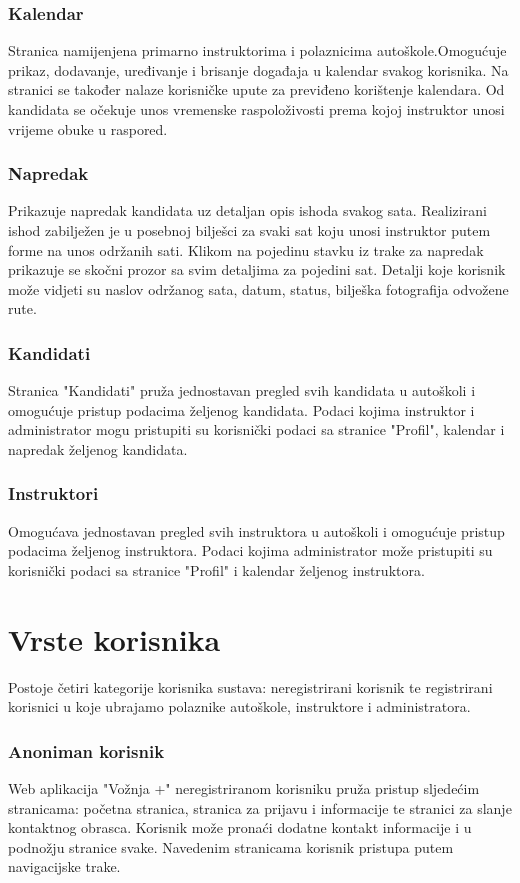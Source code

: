 \subsubsection{Kalendar}
Stranica namijenjena primarno instruktorima i polaznicima autoškole.Omogućuje prikaz, dodavanje, uređivanje i brisanje događaja u kalendar svakog korisnika. Na stranici se također nalaze korisničke upute za previđeno korištenje kalendara. Od kandidata se očekuje unos vremenske raspoloživosti prema kojoj instruktor unosi vrijeme obuke u raspored.
\subsubsection{Napredak}
Prikazuje napredak kandidata uz detaljan opis ishoda svakog sata. Realizirani ishod zabilježen je u posebnoj bilješci za svaki sat koju unosi instruktor putem forme na unos održanih sati. Klikom na pojedinu stavku iz trake za napredak prikazuje se skočni prozor sa svim detaljima za pojedini sat. Detalji koje korisnik može vidjeti su naslov održanog sata, datum, status, bilješka fotografija odvožene rute.
\subsubsection{Kandidati}
Stranica "Kandidati" pruža jednostavan pregled svih kandidata u autoškoli i omogućuje pristup podacima željenog kandidata. Podaci kojima instruktor i administrator mogu pristupiti su korisnički podaci sa stranice "Profil", kalendar i napredak željenog kandidata.
\subsubsection{Instruktori}
Omogućava  jednostavan pregled svih instruktora u autoškoli i omogućuje pristup podacima željenog instruktora. Podaci kojima administrator može pristupiti su korisnički podaci sa stranice "Profil"  i kalendar željenog instruktora.




\section{Vrste korisnika}
Postoje četiri kategorije korisnika sustava: neregistrirani korisnik te registrirani korisnici u koje ubrajamo  polaznike autoškole, instruktore i administratora.
\subsubsection{Anoniman korisnik}
Web aplikacija "Vožnja +" neregistriranom korisniku pruža pristup sljedećim stranicama: početna stranica, stranica za prijavu i informacije te stranici za slanje kontaktnog obrasca.  Korisnik može pronaći dodatne kontakt informacije i u podnožju stranice svake. Navedenim stranicama korisnik pristupa putem navigacijske trake.
